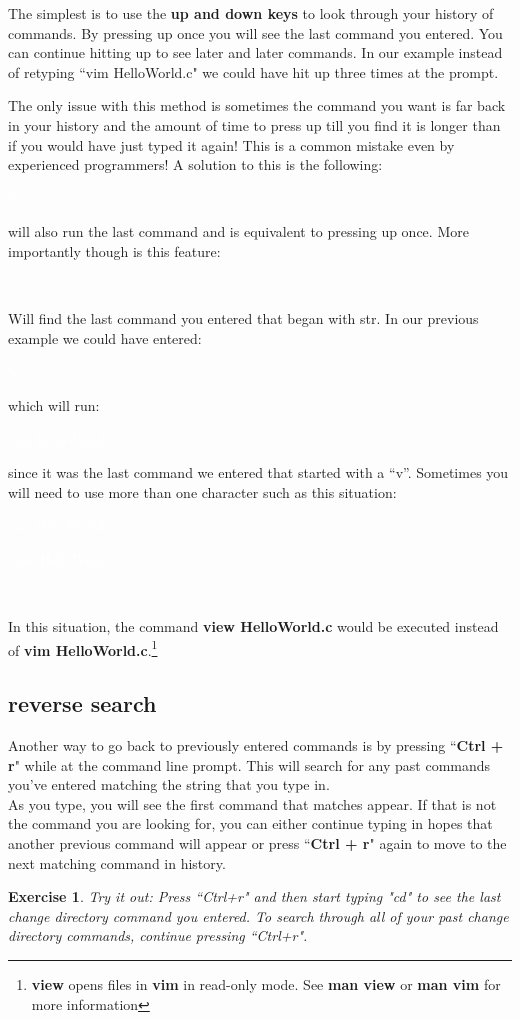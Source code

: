 \documentclass[oneside]{book}
\newcommand{\commandline}[1]{\begin{center} \colorbox{Dark}{\textcolor{white}{#1}} \end{center}}
\newtheorem{ex}{Exercise}[chapter]
\begin{document}
The simplest is to use the \textbf{up and down keys} to look through your history of commands. By pressing up once you will see the last command you entered. You can continue hitting up to see later and later commands. In our example instead of retyping ``vim HelloWorld.c" we could have hit up three times at the prompt. 

The only issue with this method is sometimes the command you want is far back in your history and the amount of time to press up till you find it is longer than if you would have just typed it again! This is a common mistake even by experienced programmers! A solution to this is the following:
\commandline{!!}
will also run the last command and is equivalent to pressing up once. More importantly though is this feature:
\commandline{!str}
Will find the last command you entered that began with str. In our previous example we could have entered:
\commandline{!v}
which will run:
\commandline{vim HelloWorld.c}
since it was the last command we entered that started with a ``v''. Sometimes you will need to use more than one character such as this situation:
\commandline{vim HelloWorld.c}
\commandline{view HelloWorld.c}
\commandline{!v}

In this situation, the command \textbf{view HelloWorld.c} would be executed instead of \textbf{vim HelloWorld.c}.\footnote{\textbf{view} opens files in \textbf{vim} in read-only mode. See \textbf{man view} or \textbf{man vim} for more information}

\subsection{reverse search}
Another way to go back to previously entered commands is by pressing ``\textbf{Ctrl + r}" while at the command line prompt.  This will search for any past commands you've entered matching the string that you type in.  \\
As you type, you will see the first command that matches appear.  If that is not the command you are looking for, you can either continue typing in hopes that another previous command will appear or press ``\textbf{Ctrl + r}" again to move to the next matching command in history.

\vspace{0.5cm}

\begin{ex}
Try it out: Press ``Ctrl+r" and then start typing "cd" to see the last change directory command you entered. To search through all of your past change directory commands, continue pressing ``Ctrl+r". 
\end{ex}
\end{document}
